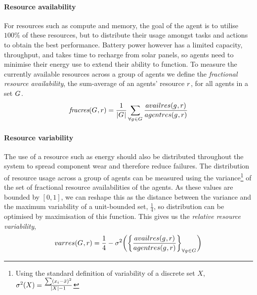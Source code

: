 \paragraph{Resource availability}
\label{section:problem:resource_availability}
\newcommand{\functionResourceAvailableSymbol}[2]{
	\functionSymbol{\textit{fracres}}}
\newcommand{\functionResourceAvailable}[2]{
	\functionSignature{\functionResourceAvailableSymbol{}{}}
	{\setAgents{#1}{}, \varResource{#2}{}}
}
\newcommand{\functionResourceVariabilitySymbol}[2]{\functionSymbol{varres}{#1}{#2}}
\newcommand{\functionResourceVariability}[2]{
	\functionSignature{\functionResourceVariabilitySymbol{}{}}
	{\setAgents{#1}{}, \varResource{#2}{}}
}

\newcommand{\functionTaskPathEnergyVariability}[2]{
	\functionSignature{\functionResourceVariabilitySymbol{}{}}
	{\functionTaskArc{}{}, \varResourceEnergy{}{}}
}
For resources such as compute and memory, the goal of the agent is to utilise $100\%$ of these resources, but to distribute their usage amongst tasks and actions to obtain the best performance. Battery power however has a limited capacity, throughput, and takes time to recharge from solar panels, so agents need to minimise their energy use to extend their ability to function. To measure the currently available resources across a group of agents we define the \textit{fractional resource availability}, the sum-average of an agents' resource $\varResource{}{}$, for all agents in a set $G_{}^{}$.
\begin{equation}
	\functionResourceAvailable{}{} 
	= \frac{1}{\funcSize{\setAgents{}{}}}
		\sum_{\forall \varAgent{}{} \in \setAgents{}{}} 
		\frac
		{\functionAgentAvailableResources{}{}}
		{\functionAgentResources{}{}}
\end{equation}

\paragraph{Resource variability}
\label{section:problem:resource_variability}
The use of a resource such as energy should also be distributed throughout the system to spread component wear and therefore reduce failures. The distribution of resource usage across a group of agents can be measured using the variance\footnote{Using the standard definition of variability of a discrete set $X$, $\sigma^2(X) = \frac{\sum (x_i - \bar{x})^2}{\lvert X \rvert-1}$} of the set of fractional resource availabilities of the agents. As these values are bounded by $[0, 1]$, we can reshape this as the distance between the variance and the maximum variability of a unit-bounded set, $\frac{1}{4}$, so distribution can be optimised by maximisation of this function. This gives us the \textit{relative resource variability},
\begin{equation}     	
	\functionResourceVariability{}{} 
	= \frac{1}{4} - \sigma^2 
	\bigg(
	\bigg\lbrace \frac
		{\functionAgentAvailableResources{}{}}
		{\functionAgentResources{}{}}
	\bigg\rbrace_{\forall \varAgent{}{} \in \setAgents{}{}}
	\bigg)
\end{equation}

